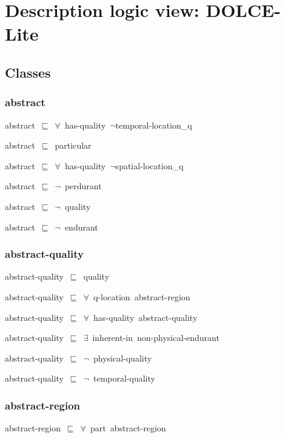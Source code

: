 \documentclass{article}
\begin{document}
\section*{Description logic view: DOLCE-Lite}

\subsection*{Classes}

\subsubsection*{abstract}

abstract~\ensuremath{\sqsubseteq}~\ensuremath{\forall}~has-quality~\ensuremath{\lnot}temporal-location\_q~

abstract~\ensuremath{\sqsubseteq}~particular~

abstract~\ensuremath{\sqsubseteq}~\ensuremath{\forall}~has-quality~\ensuremath{\lnot}spatial-location\_q~

abstract~\ensuremath{\sqsubseteq}~\ensuremath{\lnot}~perdurant

abstract~\ensuremath{\sqsubseteq}~\ensuremath{\lnot}~quality

abstract~\ensuremath{\sqsubseteq}~\ensuremath{\lnot}~endurant

\subsubsection*{abstract-quality}

abstract-quality~\ensuremath{\sqsubseteq}~quality~

abstract-quality~\ensuremath{\sqsubseteq}~\ensuremath{\forall}~q-location~abstract-region~

abstract-quality~\ensuremath{\sqsubseteq}~\ensuremath{\forall}~has-quality~abstract-quality~

abstract-quality~\ensuremath{\sqsubseteq}~\ensuremath{\exists}~inherent-in~non-physical-endurant~

abstract-quality~\ensuremath{\sqsubseteq}~\ensuremath{\lnot}~physical-quality

abstract-quality~\ensuremath{\sqsubseteq}~\ensuremath{\lnot}~temporal-quality

\subsubsection*{abstract-region}

abstract-region~\ensuremath{\sqsubseteq}~\ensuremath{\forall}~part~abstract-region~
\end{document}

